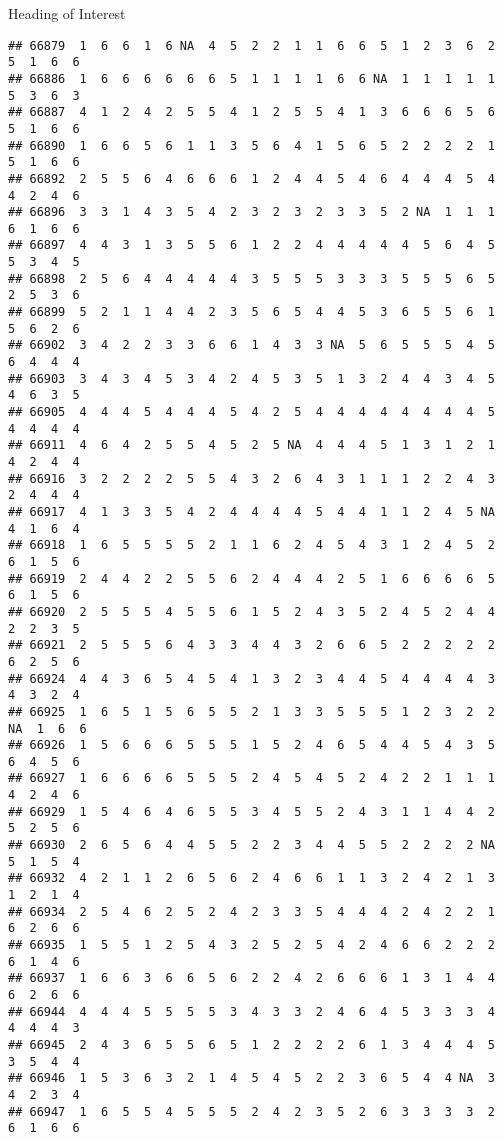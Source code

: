 \documentclass[
  ignorenonframetext,
]{beamer}
\begin{document}
\begin{frame}[fragile]{Heading of Interest}
\begin{verbatim}
## 66879  1  6  6  1  6 NA  4  5  2  2  1  1  6  6  5  1  2  3  6  2  5  1  6  6
## 66886  1  6  6  6  6  6  6  5  1  1  1  1  6  6 NA  1  1  1  1  1  5  3  6  3
## 66887  4  1  2  4  2  5  5  4  1  2  5  5  4  1  3  6  6  6  5  6  5  1  6  6
## 66890  1  6  6  5  6  1  1  3  5  6  4  1  5  6  5  2  2  2  2  1  5  1  6  6
## 66892  2  5  5  6  4  6  6  6  1  2  4  4  5  4  6  4  4  4  5  4  4  2  4  6
## 66896  3  3  1  4  3  5  4  2  3  2  3  2  3  3  5  2 NA  1  1  1  6  1  6  6
## 66897  4  4  3  1  3  5  5  6  1  2  2  4  4  4  4  4  5  6  4  5  5  3  4  5
## 66898  2  5  6  4  4  4  4  4  3  5  5  5  3  3  3  5  5  5  6  5  2  5  3  6
## 66899  5  2  1  1  4  4  2  3  5  6  5  4  4  5  3  6  5  5  6  1  5  6  2  6
## 66902  3  4  2  2  3  3  6  6  1  4  3  3 NA  5  6  5  5  5  4  5  6  4  4  4
## 66903  3  4  3  4  5  3  4  2  4  5  3  5  1  3  2  4  4  3  4  5  4  6  3  5
## 66905  4  4  4  5  4  4  4  5  4  2  5  4  4  4  4  4  4  4  4  5  4  4  4  4
## 66911  4  6  4  2  5  5  4  5  2  5 NA  4  4  4  5  1  3  1  2  1  4  2  4  4
## 66916  3  2  2  2  2  5  5  4  3  2  6  4  3  1  1  1  2  2  4  3  2  4  4  4
## 66917  4  1  3  3  5  4  2  4  4  4  4  5  4  4  1  1  2  4  5 NA  4  1  6  4
## 66918  1  6  5  5  5  5  2  1  1  6  2  4  5  4  3  1  2  4  5  2  6  1  5  6
## 66919  2  4  4  2  2  5  5  6  2  4  4  4  2  5  1  6  6  6  6  5  6  1  5  6
## 66920  2  5  5  5  4  5  5  6  1  5  2  4  3  5  2  4  5  2  4  4  2  2  3  5
## 66921  2  5  5  5  6  4  3  3  4  4  3  2  6  6  5  2  2  2  2  2  6  2  5  6
## 66924  4  4  3  6  5  4  5  4  1  3  2  3  4  4  5  4  4  4  4  3  4  3  2  4
## 66925  1  6  5  1  5  6  5  5  2  1  3  3  5  5  5  1  2  3  2  2 NA  1  6  6
## 66926  1  5  6  6  6  5  5  5  1  5  2  4  6  5  4  4  5  4  3  5  6  4  5  6
## 66927  1  6  6  6  6  5  5  5  2  4  5  4  5  2  4  2  2  1  1  1  4  2  4  6
## 66929  1  5  4  6  4  6  5  5  3  4  5  5  2  4  3  1  1  4  4  2  5  2  5  6
## 66930  2  6  5  6  4  4  5  5  2  2  3  4  4  5  5  2  2  2  2 NA  5  1  5  4
## 66932  4  2  1  1  2  6  5  6  2  4  6  6  1  1  3  2  4  2  1  3  1  2  1  4
## 66934  2  5  4  6  2  5  2  4  2  3  3  5  4  4  4  2  4  2  2  1  6  2  6  6
## 66935  1  5  5  1  2  5  4  3  2  5  2  5  4  2  4  6  6  2  2  2  6  1  4  6
## 66937  1  6  6  3  6  6  5  6  2  2  4  2  6  6  6  1  3  1  4  4  6  2  6  6
## 66944  4  4  4  5  5  5  5  3  4  3  3  2  4  6  4  5  3  3  3  4  4  4  4  3
## 66945  2  4  3  6  5  5  6  5  1  2  2  2  2  6  1  3  4  4  4  5  3  5  4  4
## 66946  1  5  3  6  3  2  1  4  5  4  5  2  2  3  6  5  4  4 NA  3  4  2  3  4
## 66947  1  6  5  5  4  5  5  5  2  4  2  3  5  2  6  3  3  3  3  2  6  1  6  6

\end{verbatim}
\end{frame}
\end{document}
